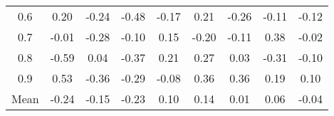 \documentclass[11pt,a4paper]{report}
\begin{document}
\begin{longtable}{ | c || c | c | c | c | c | c | c || c |}
0.6 &  \cellcolor[HTML]{F7F7FF} 0.20 &  \cellcolor[HTML]{FFF7F7} -0.24 &  \cellcolor[HTML]{FFEFEF} -0.48 &  \cellcolor[HTML]{FFF7F7} -0.17 &  \cellcolor[HTML]{F7F7FF} 0.21 &  \cellcolor[HTML]{FFF7F7} -0.26 &  \cellcolor[HTML]{FFFFFF} -0.11 &  \cellcolor[HTML]{FFFFFF} -0.12 \\
0.7 &  \cellcolor[HTML]{FFFFFF} -0.01 &  \cellcolor[HTML]{FFF7F7} -0.28 &  \cellcolor[HTML]{FFFFFF} -0.10 &  \cellcolor[HTML]{FFFFFF} 0.15 &  \cellcolor[HTML]{FFF7F7} -0.20 &  \cellcolor[HTML]{FFFFFF} -0.11 &  \cellcolor[HTML]{F7F7FF} 0.38 &  \cellcolor[HTML]{FFFFFF} -0.02 \\
0.8 &  \cellcolor[HTML]{FFEFEF} -0.59 &  \cellcolor[HTML]{FFFFFF} 0.04 &  \cellcolor[HTML]{FFF7F7} -0.37 &  \cellcolor[HTML]{F7F7FF} 0.21 &  \cellcolor[HTML]{F7F7FF} 0.27 &  \cellcolor[HTML]{FFFFFF} 0.03 &  \cellcolor[HTML]{FFF7F7} -0.31 &  \cellcolor[HTML]{FFFFFF} -0.10 \\
0.9 &  \cellcolor[HTML]{EFEFFF} 0.53 &  \cellcolor[HTML]{FFF7F7} -0.36 &  \cellcolor[HTML]{FFF7F7} -0.29 &  \cellcolor[HTML]{FFFFFF} -0.08 &  \cellcolor[HTML]{F7F7FF} 0.36 &  \cellcolor[HTML]{F7F7FF} 0.36 &  \cellcolor[HTML]{F7F7FF} 0.19 &  \cellcolor[HTML]{FFFFFF} 0.10 \\
\hline
\hline
Mean  &  \cellcolor[HTML]{FFF7F7} -0.24 &  \cellcolor[HTML]{FFFFFF} -0.15 &  \cellcolor[HTML]{FFF7F7} -0.23 &  \cellcolor[HTML]{FFFFFF} 0.10 &  \cellcolor[HTML]{FFFFFF} 0.14 &  \cellcolor[HTML]{FFFFFF} 0.01 &  \cellcolor[HTML]{FFFFFF} 0.06 &  \cellcolor[HTML]{FFFFFF} -0.04 \\
\hline
\end{longtable}
\end{document}

